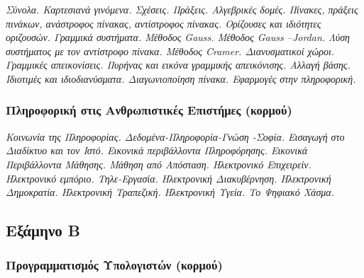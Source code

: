 \emph{Σύνολα. Καρτεσιανά γινόμενα. Σχέσεις. Πράξεις. Αλγεβρικές δομές.
Πίνακες, πράξεις πινάκων, ανάστροφος πίνακας, αντίστροφος πίνακας.
Ορίζουσες και ιδιότητες οριζουσών. Γραμμικά συστήματα. Μέθοδος Gauss.
Μέθοδος Gauss --Jordan. Λύση συστήματος με τον αντίστροφο πίνακα.
Μέθοδος Cramer. Διανυσματικοί χώροι. Γραμμικές απεικονίσεις. Πυρήνας και
εικόνα γραμμικής απεικόνισης. Αλλαγή βάσης. Ιδιοτιμές και
ιδιοδιανύσματα. Διαγωνιοποίηση πίνακα. Εφαρμογές στην πληροφορική.}

\hypertarget{ux3c0ux3bbux3b7ux3c1ux3bfux3c6ux3bfux3c1ux3b9ux3baux3ae-ux3c3ux3c4ux3b9ux3c2-ux3b1ux3bdux3b8ux3c1ux3c9ux3c0ux3b9ux3c3ux3c4ux3b9ux3baux3adux3c2-ux3b5ux3c0ux3b9ux3c3ux3c4ux3aeux3bcux3b5ux3c2-ux3baux3bfux3c1ux3bcux3bfux3cd}{%
\subsubsection{Πληροφορική στις Ανθρωπιστικές Επιστήμες
(κορμού)}\label{ux3c0ux3bbux3b7ux3c1ux3bfux3c6ux3bfux3c1ux3b9ux3baux3ae-ux3c3ux3c4ux3b9ux3c2-ux3b1ux3bdux3b8ux3c1ux3c9ux3c0ux3b9ux3c3ux3c4ux3b9ux3baux3adux3c2-ux3b5ux3c0ux3b9ux3c3ux3c4ux3aeux3bcux3b5ux3c2-ux3baux3bfux3c1ux3bcux3bfux3cd}}

\emph{Κοινωνία της Πληροφορίας. Δεδομένα-Πληροφορία-Γνώση -Σοφία.
Εισαγωγή στο Διαδίκτυο και τον Ιστό. Εικονικά περιβάλλοντα Πληροφόρησης.
Εικονικά Περιβάλλοντα Μάθησης. Μάθηση από Απόσταση. Ηλεκτρονικό
Επιχειρείν. Ηλεκτρονικό εμπόριο. Τηλε-Εργασία. Ηλεκτρονική Διακυβέρνηση.
Ηλεκτρονική Δημοκρατία. Ηλεκτρονική Τραπεζική. Ηλεκτρονική Υγεία. Το
Ψηφιακό Χάσμα.}

\hypertarget{ux3b5ux3beux3acux3bcux3b7ux3bdux3bf-ux3b2}{%
\subsection{Εξάμηνο Β}\label{ux3b5ux3beux3acux3bcux3b7ux3bdux3bf-ux3b2}}

\hypertarget{ux3c0ux3c1ux3bfux3b3ux3c1ux3b1ux3bcux3bcux3b1ux3c4ux3b9ux3c3ux3bcux3ccux3c2-ux3c5ux3c0ux3bfux3bbux3bfux3b3ux3b9ux3c3ux3c4ux3ceux3bd-ux3baux3bfux3c1ux3bcux3bfux3cd}{%
\subsubsection{Προγραμματισμός Υπολογιστών
(κορμού)}\label{ux3c0ux3c1ux3bfux3b3ux3c1ux3b1ux3bcux3bcux3b1ux3c4ux3b9ux3c3ux3bcux3ccux3c2-ux3c5ux3c0ux3bfux3bbux3bfux3b3ux3b9ux3c3ux3c4ux3ceux3bd-ux3baux3bfux3c1ux3bcux3bfux3cd}}

